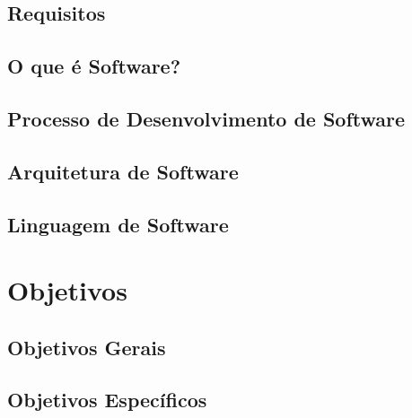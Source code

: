 \subsection{Requisitos}

\subsection{O que é Software?}

\subsection{Processo de Desenvolvimento de Software}

\subsection{Arquitetura de Software}

\subsection{Linguagem de Software}

\section{Objetivos}

\subsection{Objetivos Gerais}

\subsection{Objetivos Específicos}


